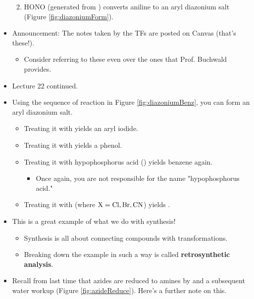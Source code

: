 \documentclass[../notes.tex]{subfiles}
\begin{document}
\begin{itemize}
\begin{enumerate}[label={\Alph*.}]
\begin{itemize}
        \end{itemize}
        \item HONO (generated from ) converts aniline to an aryl diazonium salt (Figure \ref{fig:diazoniumForm}).
    \end{enumerate}
    \item Announcement: The notes taken by the TFs are posted on Canvas (that's these!).
    \begin{itemize}
        \item Consider referring to these even over the ones that Prof. Buchwald provides.
    \end{itemize}
    \item Lecture 22 continued.
    \item Using the sequence of reaction in Figure \ref{fig:diazoniumBenz}, you can form an aryl diazonium salt.
    \begin{itemize}
        \item Treating it with  yields an aryl iodide.
        \item Treating it with  yields a phenol.
        \item Treating it with hypophosphorus acid () yields benzene again.
        \begin{itemize}
            \item Once again, you are not responsible for the name "hypophosphorus acid."
        \end{itemize}
        \item Treating it with  (where $\ce{X}=\ce{Cl},\ce{Br},\ce{CN}$) yields .
    \end{itemize}
    \item This is a great example of what we do with synthesis!
    \begin{itemize}
        \item Synthesis is all about connecting compounds with transformations.
        \item Breaking down the example in such a way is called \textbf{retrosynthetic analysis}.
    \end{itemize}
    \item Recall from last time that azides are reduced to amines by  and a subsequent water workup (Figure \ref{fig:azideReduce}). Here's a further note on this.
    \begin{figure}[H]

\end{figure}
\end{itemize}
\end{document}
